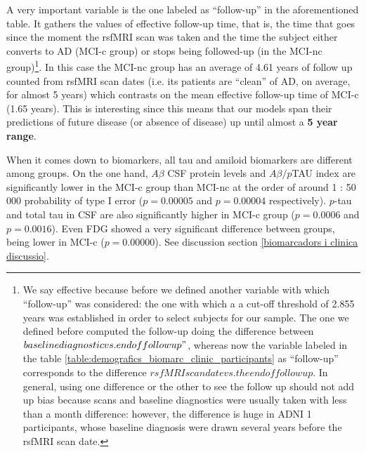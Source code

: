 \documentclass[a4paper,12pt]{elsarticle}  %
\begin{document}
		A very important variable is the one labeled as ``follow-up'' in the aforementioned table. It gathers the values of effective follow-up time, that is, the time that goes since the moment the rsfMRI scan was taken and the time the subject either converts to AD (MCI-c group) or stops being followed-up (in the MCI-nc group)\footnote{We say effective because before we defined another variable with which ``follow-up'' was considered: the one with which a a cut-off threshold of 2.855 years was established in order to select subjects for our sample. The one we defined before computed the follow-up doing the difference between $baseline diagnostic vs. end of followup"$, whereas now the variable labeled in the table \ref{table:demografics_biomarc_clinic_participants} as ``follow-up'' corresponds to the difference $rsfMRI scandate vs. the end of followup$. In general, using one difference or the other to see the follow up should not add up bias because scans and baseline diagnostics were usually taken with less than a month difference: however, the difference is huge in ADNI 1 participants, whose baseline diagnosis were drawn several years before the rsfMRI scan date.}. In this case the MCI-nc group has an average of 4.61 years of follow up counted from rsfMRI scan dates (i.e. its patients are ``clean'' of AD, on average, for almost 5 years) which contrasts on the mean effective follow-up time of MCI-c (1.65 years). This is interesting since this means that our models span their predictions of future disease (or absence of disease) up until almost a \textbf{5 year range}.
		
		When it comes down to biomarkers, all tau and amiloid biomarkers are different among groups.  On the one hand, $A\beta$ CSF protein levels and $A\beta/p$TAU index are significantly lower in the MCI-c group than MCI-nc at the order of around 1 : 50 000 probability of type I error ($p = 0.00005$ and $p = 0.00004$ respectively). $p$-tau and total tau in CSF are also significantly higher in MCI-c group ($p = 0.0006$ and $p = 0.0016$). Even FDG showed a very significant difference between groups, being lower in MCI-c ($p = 0.00000$). See discussion section \ref{biomarcadors i clinica discussio}.
		
\end{document}
